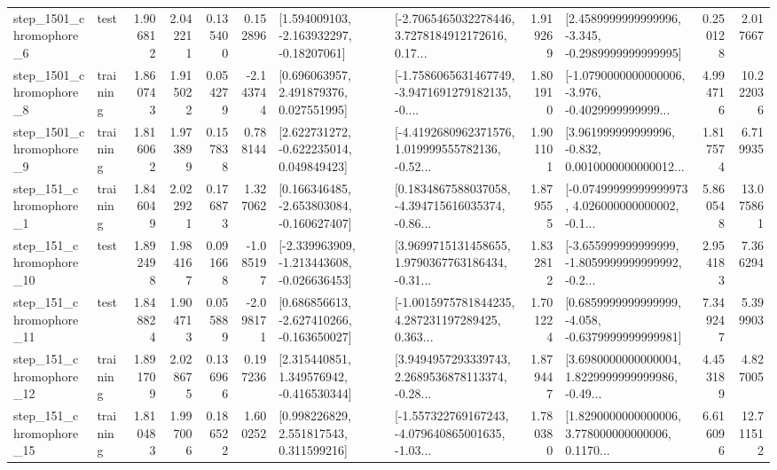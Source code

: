 \begin{tabular}{llrrrrllrlrr}
  step\_1501\_chromophore\_6 &      test &      1.906812 &    2.042211 &      0.135400 &  0.152896 &    [1.594009103, -2.163932297, -0.18207061] &  [-2.7065465032278446, 3.7278184912172616, 0.17... &       1.919269 &  [2.4589999999999996, -3.345, -0.2989999999999995] &            0.250128 &          2.017667 \\
  step\_1501\_chromophore\_8 &  training &      1.860743 &    1.915022 &      0.054279 & -2.143744 &     [0.696063957, 2.491879376, 0.027551995] &  [-1.7586065631467749, -3.9471691279182135, -0.... &       1.801910 &  [-1.0790000000000006, -3.976, -0.4029999999999... &            4.994716 &         10.222036 \\
  step\_1501\_chromophore\_9 &  training &      1.816062 &    1.973899 &      0.157838 &  0.788144 &    [2.622731272, -0.622235014, 0.049849423] &  [-4.4192680962371576, 1.019999555782136, -0.52... &       1.901101 &  [3.961999999999996, -0.832, 0.0010000000000012... &            1.817574 &          6.719935 \\
   step\_151\_chromophore\_1 &  training &      1.846049 &    2.022921 &      0.176873 &  1.327062 &   [0.166346485, -2.653803084, -0.160627407] &  [0.1834867588037058, -4.394715616035374, -0.86... &       1.879555 &  [-0.07499999999999973, 4.026000000000002, -0.1... &            5.860548 &         13.075861 \\
  step\_151\_chromophore\_10 &      test &      1.892498 &    1.984167 &      0.091668 & -1.085197 &  [-2.339963909, -1.213443608, -0.026636453] &  [3.9699715131458655, 1.9790367763186434, -0.31... &       1.832812 &  [-3.655999999999999, -1.8059999999999992, -0.2... &            2.954183 &          7.366294 \\
  step\_151\_chromophore\_11 &      test &      1.848824 &    1.904713 &      0.055889 & -2.098171 &   [0.686856613, -2.627410266, -0.163650027] &  [-1.0015975781844235, 4.287231197289425, 0.363... &       1.701224 &  [0.6859999999999999, -4.058, -0.6379999999999981] &            7.349247 &          5.399903 \\
  step\_151\_chromophore\_12 &  training &      1.891709 &    2.028675 &      0.136966 &  0.197236 &    [2.315440851, 1.349576942, -0.416530344] &  [3.9494957293339743, 2.2689536878113374, -0.28... &       1.879447 &  [3.6980000000000004, 1.8229999999999986, -0.49... &            4.453189 &          4.827005 \\
  step\_151\_chromophore\_15 &  training &      1.810483 &    1.997006 &      0.186522 &  1.600252 &     [0.998226829, 2.551817543, 0.311599216] &  [-1.557322769167243, -4.079640865001635, -1.03... &       1.780380 &  [1.8290000000000006, 3.778000000000006, 0.1170... &            6.616096 &         12.711512 \\

\end{tabular}
